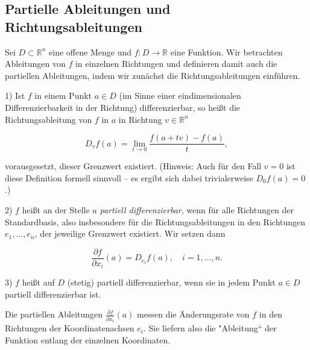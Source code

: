 \subsection{Partielle Ableitungen und Richtungsableitungen}

Sei \( D \subset \mathbb{R}^n \) eine offene Menge und \( f: D \to \mathbb{R} \) eine Funktion. Wir betrachten Ableitungen von \( f \) in einzelnen Richtungen und definieren damit auch die partiellen Ableitungen, indem wir zunächst die Richtungsableitungen einführen.

\begin{definition}{}
1) Ist \( f \) in einem Punkt \( a \in D \) (im Sinne einer eindimensionalen Differenzierbarkeit in der Richtung) differenzierbar, so heißt die Richtungsableitung von \( f \) in \( a \) in Richtung \( v \in \mathbb{R}^n \)


\[
D_v f(a) = \lim_{t\to 0} \frac{f(a+tv)-f(a)}{t},
\]


vorausgesetzt, dieser Grenzwert existiert. (Hinweis: Auch für den Fall \( v=0 \) ist diese Definition formell sinnvoll – es ergibt sich dabei trivialerweise \( D_{0}f(a)=0 \).)


2) \( f \) heißt an der Stelle \( a \) \emph{partiell differenzierbar}, wenn für alle Richtungen der Standardbasis, also insbesondere für die Richtungsableitungen in den Richtungen \( e_1,\dots,e_n \), der jeweilige Grenzwert existiert. Wir setzen dann


\[
\frac{\partial f}{\partial x_i}(a) = D_{e_i} f(a), \quad i=1,\dots,n.
\]


3) \( f \) heißt auf \( D \) (stetig) partiell differenzierbar, wenn sie in jedem Punkt \( a \in D \) partiell differenzierbar ist.
\end{definition}

\begin{bemerkungbox}
    Die partiellen Ableitungen \(\frac{\partial f}{\partial x_i}(a)\) messen die Änderungsrate von \( f \) in den Richtungen der Koordinatenachsen \( e_i \). Sie liefern also die "Ableitung“ der Funktion entlang der einzelnen Koordinaten.
\end{bemerkungbox}


